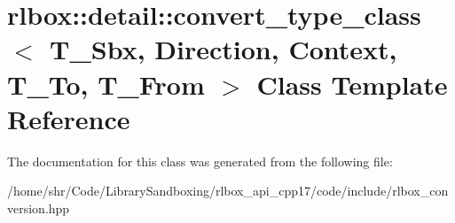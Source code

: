\hypertarget{classrlbox_1_1detail_1_1convert__type__class}{}\section{rlbox\+:\+:detail\+:\+:convert\+\_\+type\+\_\+class$<$ T\+\_\+\+Sbx, Direction, Context, T\+\_\+\+To, T\+\_\+\+From $>$ Class Template Reference}
\label{classrlbox_1_1detail_1_1convert__type__class}


The documentation for this class was generated from the following file\+:\begin{DoxyCompactItemize}
\item 
/home/shr/\+Code/\+Library\+Sandboxing/rlbox\+\_\+api\+\_\+cpp17/code/include/rlbox\+\_\+conversion.\+hpp\end{DoxyCompactItemize}
